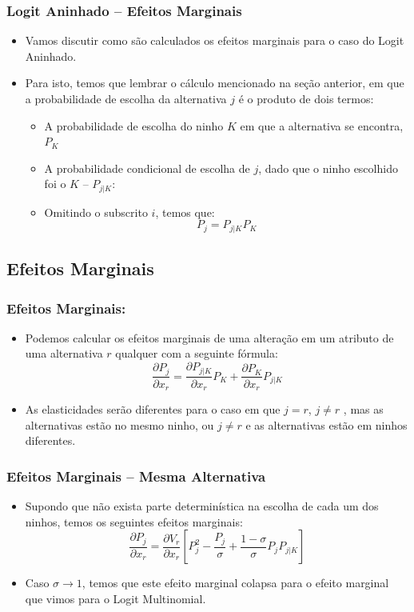 \documentclass{beamer}
\begin{document}
\begin{frame}\frametitle{Logit Aninhado -- Efeitos Marginais}

\begin{itemize}
\item Vamos discutir como são calculados os efeitos marginais para o caso
do Logit Aninhado.
\item Para isto, temos que lembrar o cálculo mencionado na seção anterior,
em que a probabilidade de escolha da alternativa $j$ é o produto
de dois termos: 

\begin{itemize}
\item A probabilidade de escolha do ninho $K$ em que a alternativa se encontra,
$P_{K}$
\item A probabilidade condicional de escolha de $j$, dado que o ninho escolhido
foi o $K$ -- $P_{j|K}$:
\item Omitindo o subscrito $i$, temos que:
\[
P_{j}=P_{j|K}P_{K}
\]
\end{itemize}
\end{itemize}
\end{frame}

\subsection{Efeitos Marginais}
\begin{frame}\frametitle{Efeitos Marginais:}

\begin{itemize}
\item Podemos calcular os efeitos marginais de uma alteração em um atributo
de uma alternativa $r$ qualquer com a seguinte fórmula:
\[
\frac{\partial P_{j}}{\partial x_{r}}=\frac{\partial P_{j|K}}{\partial x_{r}}P_{K}+\frac{\partial P_{K}}{\partial x_{r}}P_{j|K}
\]
\item As elasticidades serão diferentes para o caso em que $j=r$, $j\neq r$
, mas as alternativas estão no mesmo ninho, ou $j\neq r$ e as alternativas
estão em ninhos diferentes.
\end{itemize}
\end{frame}

\begin{frame}\frametitle{Efeitos Marginais -- Mesma Alternativa}

\begin{itemize}
\item Supondo que não exista parte determinística na escolha de cada um
dos ninhos, temos os seguintes efeitos marginais:
\[
\frac{\partial P_{j}}{\partial x_{r}}=\frac{\partial V_{r}}{\partial x_{r}}\left[P_{j}^{2}-\frac{P_{j}}{\sigma}+\frac{1-\sigma}{\sigma}P_{j}P_{j|K}\right]
\]
\item Caso $\sigma\rightarrow1$, temos que este efeito marginal colapsa
para o efeito marginal que vimos para o Logit Multinomial.
\end{itemize}
\end{frame}
\end{document}
